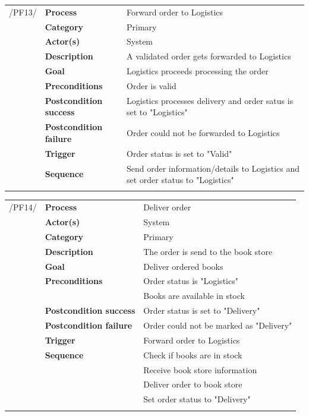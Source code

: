 \documentclass[11pt,a4paper,oneside,svgnames]{report}
\begin{document}
\noindent
\begin{tabular}{p{1.5cm}p{3cm}p{8cm}}
\cellcolor{white}	 /PF13/	& \textbf{Process} & Forward order to Logistics\\ 
\cellcolor{white}		& \textbf{Category} & Primary\\
\cellcolor{white}		& \textbf{Actor(s)} & System\\ 
\cellcolor{white}		& \textbf{Description}	 & A validated order gets forwarded to Logistics\\ 
\cellcolor{white}		& \textbf{Goal} & Logistics proceeds processing the order\\
\cellcolor{white}		& \textbf{Preconditions} & Order is valid\\
\cellcolor{white}		& \textbf{Postcondition success} & Logistics processes delivery and order satus is set to "Logistics"\\
\cellcolor{white}		& \textbf{Postcondition failure} & Order could not be forwarded to Logistics\\
\cellcolor{white}		& \textbf{Trigger} & Order status is set to "Valid"\\
\cellcolor{white}		& \textbf{Sequence} & Send order information/details to Logistics and set order status to "Logistics"\\
\cellcolor{white}\hfill \\
\end{tabular}

\noindent
\begin{tabular}{p{1.5cm}p{3cm}p{8cm}}
\cellcolor{white}/PF14/	& \textbf{Process} & Deliver order\\
\cellcolor{white}		& \textbf{Actor(s)} & System\\
\cellcolor{white}		& \textbf{Category} & Primary\\
\cellcolor{white}		& \textbf{Description}	 &  The order is send to the book store\\
\cellcolor{white}		& \textbf{Goal} & Deliver ordered books\\
\cellcolor{white}		& \textbf{Preconditions} & Order status is "Logistics"\\
\cellcolor{white}		& & Books are available in stock\\
\cellcolor{white}		& \textbf{Postcondition success} & Order status is set to "Delivery"\\
\cellcolor{white}		& \textbf{Postcondition failure} & Order could not be marked as "Delivery"\\
\cellcolor{white}		& \textbf{Trigger} & Forward order to Logistics\\
\cellcolor{white}		& \textbf{Sequence} & Check if books are in stock\\
\cellcolor{white}		& & Receive book store information\\
\cellcolor{white}		& & Deliver order to book store\\
\cellcolor{white}		& & Set order status to "Delivery"\\
\cellcolor{white}\hfill \\
\end{tabular}
\end{document}
